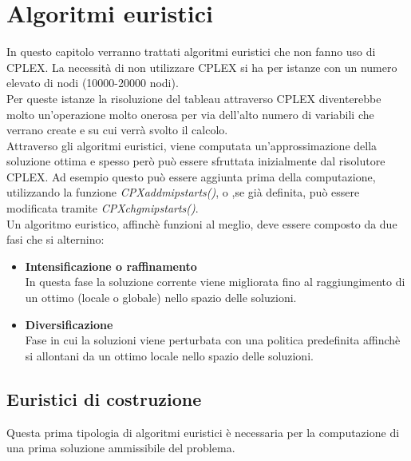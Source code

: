 \chapter{Algoritmi euristici}
In questo capitolo verranno trattati algoritmi euristici che non fanno uso di CPLEX. La necessità di non utilizzare CPLEX si ha per istanze con un numero elevato di nodi (10000-20000 nodi).\\
Per queste istanze la risoluzione del tableau attraverso CPLEX diventerebbe molto un'operazione molto onerosa per via dell'alto numero di variabili che verrano create e su cui verrà svolto il calcolo.\\
Attraverso gli algoritmi euristici, viene computata un'approssimazione della soluzione ottima e spesso però può essere sfruttata inizialmente dal risolutore CPLEX. Ad esempio questo può essere aggiunta prima della computazione, utilizzando la funzione \textit{CPXaddmipstarts()}, o ,se già definita, può essere modificata tramite \textit{CPXchgmipstarts()}.\\
Un algoritmo euristico, affinchè funzioni al meglio, deve essere composto da due fasi che si alternino:
\begin{itemize}
\item{\textbf{Intensificazione o raffinamento}\\
In questa fase la soluzione corrente viene migliorata fino al raggiungimento di un ottimo (locale o globale) nello spazio delle soluzioni.
}
\item{\textbf{Diversificazione}\\
Fase in cui la soluzioni viene perturbata con una politica predefinita affinchè si allontani da un ottimo locale nello spazio delle soluzioni.
}
\end{itemize}


\section{Euristici di costruzione}
Questa prima tipologia di algoritmi euristici è necessaria per la computazione di una prima soluzione ammissibile del problema.
